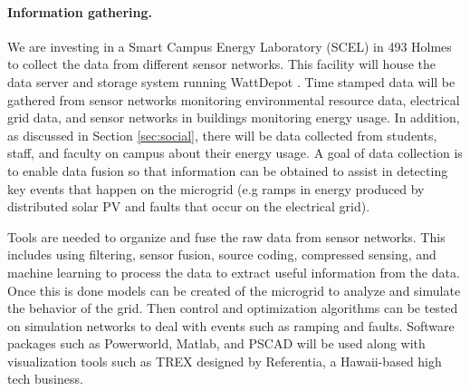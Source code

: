 \paragraph{Information gathering.}

We are investing in a Smart Campus Energy Laboratory (SCEL) in 493 Holmes to collect the data from different sensor networks. This facility will house the data server and 
storage system running WattDepot \cite{csdl2-10-05}.  Time stamped data will
be gathered from sensor networks monitoring environmental resource data,
electrical grid data, and sensor networks in buildings monitoring energy
usage.  In addition, as discussed in Section \ref{sec:social}, there will
be data collected from students, staff, and faculty on campus about their
energy usage.  A goal of data collection is to enable data fusion so
that information can be obtained to assist in detecting key events that
happen on the microgrid (e.g ramps in energy produced by distributed solar
PV and faults that occur on the electrical grid).

Tools are needed to organize and fuse the raw data from sensor networks.
This includes using filtering, sensor fusion, source coding, compressed
sensing, and machine learning to process the data to extract useful
information from the data.  Once this is done models can be created of the
microgrid to analyze and simulate the behavior of the grid.  Then control
and optimization algorithms can be tested on simulation networks to deal
with events such as ramping and faults.  Software packages such as Powerworld, Matlab, and PSCAD will be used along with visualization tools such as TREX designed by Referentia, a Hawaii-based high tech business.

 



